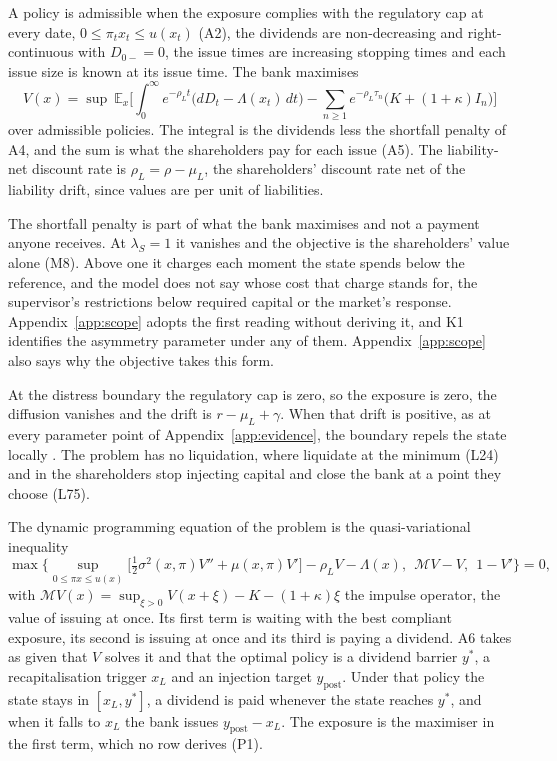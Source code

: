 A policy is admissible when the exposure complies with the regulatory cap at
every date, $0\le\pi_tx_t\le u(x_t)$ (A2), the dividends are non-decreasing
and right-continuous with $D_{0-}=0$, the issue times are increasing stopping
times and each issue size is known at its issue time. The bank maximises
\[
V(x)=\sup\ \mathbb E_x\Big[\int_0^\infty e^{-\rho_Lt}\big(dD_t-\Lambda(x_t)\,dt\big)-\sum_{n\ge1}e^{-\rho_L\tau_n}\big(K+(1+\kappa)I_n\big)\Big]
\]
over admissible policies. The integral is the dividends less the shortfall
penalty of A4, and the sum is what the shareholders pay for each issue (A5).
The liability-net discount rate is $\rho_L=\rho-\mu_L$, the shareholders'
discount rate net of the liability drift, since values are per unit of
liabilities.

The shortfall penalty is part of what the bank maximises and not a payment
anyone receives. At $\lambda_S=1$ it vanishes and the objective is the
shareholders' value alone (M8). Above one it charges each moment the state
spends below the reference, and the model does not say whose cost that charge
stands for, the supervisor's restrictions below required capital or the
market's response. Appendix~\ref{app:scope} adopts the first reading without
deriving it, and K1 identifies the asymmetry parameter under any of them. Appendix~\ref{app:scope} also says why the objective
takes this form.

At the distress boundary the regulatory cap is zero, so the exposure is zero,
the diffusion vanishes and the drift is $r-\mu_L+\gamma$. When that drift is
positive, as at every parameter point of Appendix~\ref{app:evidence}, the
boundary repels the state locally \citep[Remark 3.1]{bayraktar2026}. The
problem has no liquidation, where \citet{peura2006} liquidate at the minimum
(L24) and in \citet{fries1997} the shareholders stop injecting capital and
close the bank at a point they choose (L75).

The dynamic programming equation of the problem is the quasi-variational
inequality
\begin{equation}\label{eq:qvi}
\max\Big\{\sup_{0\le\pi x\le u(x)}\big[\tfrac12\sigma^2(x,\pi)V''+\mu(x,\pi)V'\big]-\rho_LV-\Lambda(x),\ \ \mathcal MV-V,\ \ 1-V'\Big\}=0,
\end{equation}
with $\mathcal MV(x)=\sup_{\xi>0}V(x+\xi)-K-(1+\kappa)\xi$ the impulse
operator, the value of issuing at once. Its first term is waiting with the
best compliant exposure, its second is issuing at once and its third is paying
a dividend. A6 takes as given that $V$ solves it and that the optimal policy is
a dividend barrier $y^*$, a recapitalisation trigger $x_L$ and an injection
target $y_{\text{post}}$. Under that policy the state stays in $[x_L,y^*]$, a
dividend is paid whenever the state reaches $y^*$, and when it falls to $x_L$
the bank issues $y_{\text{post}}-x_L$. The exposure is the maximiser in the
first term, which no row derives (P1).

